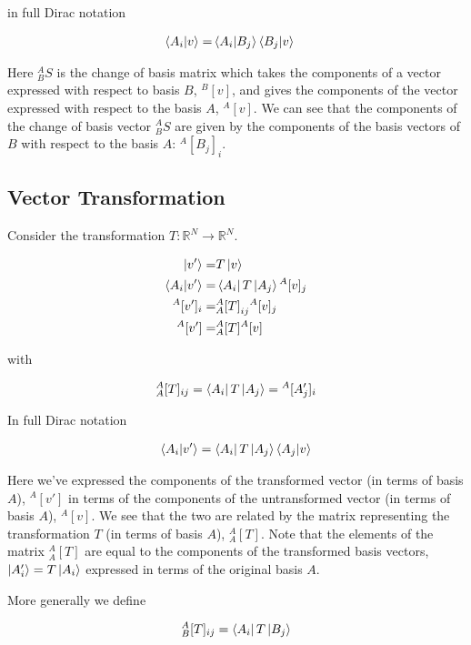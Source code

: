 \documentclass[12pt]{article}
\begin{document}
in full Dirac notation

\begin{align}
\braket{A_i|v} =& \braket{A_i|B_j} \braket{B_j |v}
\end{align}

Here ${^A_B S}$ is the change of basis matrix which takes the components of a vector expressed with respect to basis $B$, ${^B[v]}$, and gives the components of the vector expressed with respect to the basis $A$, ${^A[v]}$.
We can see that the components of the change of basis vector ${^A_B S}$ are given by the components of the basis vectors of $B$ with respect to the basis $A$: ${^A[B_j]_i}$.

\subsection{Vector Transformation}
Consider the transformation $T:\mathbb{R}^N\rightarrow\mathbb{R}^N$.

\begin{align}
\ket{v'} =& T \ket{v}\\
\braket{A_i|v'} =& \bra{A_i}T\ket{A_j}{^A[v]_j}\\
{^A[v']_i} =& {^A_A[T]}_{ij} {^A[v]_j}\\
{^A[v']} =& {^A_A[T]}{^A[v]}
\end{align}

with

\begin{align}
{^A_A[T]_{ij}} = \bra{A_i}T\ket{A_j} = {^A[A'_j]_i}
\end{align}

In full Dirac notation

\begin{align}
\braket{A_i|v'} = \bra{A_i} T \ket{A_j} \braket{A_j | v}
\end{align}

Here we've expressed the components of the transformed vector (in terms of basis $A$), ${^A[v']}$ in terms of the components of the untransformed vector (in terms of basis $A$), ${^A[v]}$.
We see that the two are related by the matrix representing the transformation $T$ (in terms of basis $A$), ${^A_A[T]}$.
Note that the elements of the matrix ${^A_A[T]}$ are equal to the components of the transformed basis vectors, $\ket{A'_i} = T\ket{A_i}$ expressed in terms of the original basis $A$.

More generally we define

\begin{align}
{^A_B[T]_{ij}} = \bra{A_i}T\ket{B_j}
\end{align}
\end{document}
